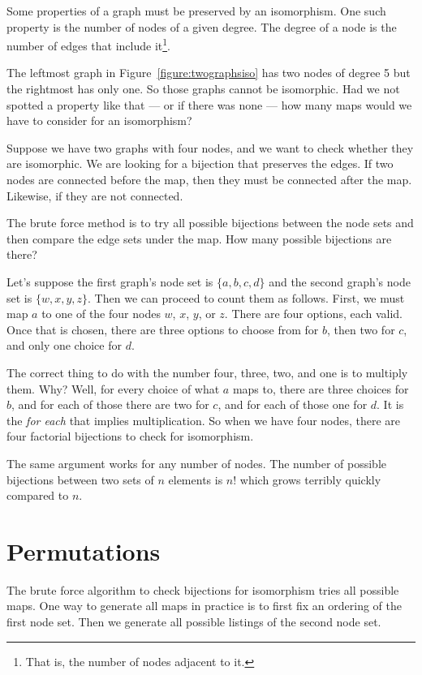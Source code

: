 \documentclass{iansnotes}
\begin{document}
  Some properties of a graph must be preserved by an isomorphism.
  One such property is the number of nodes of a given degree.
  The degree of a node is the number of edges that include it\footnote{That is, the number of nodes adjacent to it.}.

  The leftmost graph in Figure~\ref{figure:twographsiso} has two nodes of degree 5 but the rightmost has only one.
  So those graphs cannot be isomorphic.
  Had we not spotted a property like that --- or if there was none --- how many maps would we have to consider for an isomorphism?

  Suppose we have two graphs with four nodes, and we want to check whether they are isomorphic.
  We are looking for a bijection that preserves the edges.
  If two nodes are connected before the map, then they must be connected after the map.
  Likewise, if they are not connected.

  The brute force method is to try all possible bijections between the node sets and then compare the edge sets under the map.
  How many possible bijections are there?
  
  Let's suppose the first graph's node set is $\{a, b, c, d\}$ and the second graph's node set is $\{w, x, y, z\}$.
  Then we can proceed to count them as follows.
  First, we must map $a$ to one of the four nodes $w$, $x$, $y$, or $z$.
  There are four options, each valid.
  Once that is chosen, there are three options to choose from for $b$, then two for $c$, and only one choice for $d$.

  The correct thing to do with the number four, three, two, and one is to multiply them.
  Why?
  Well, for every choice of what $a$ maps to, there are three choices for $b$, and for each of those there are two for $c$, and for each of those one for $d$.
  It is the \emph{for each} that implies multiplication.
  So when we have four nodes, there are four factorial bijections to check for isomorphism.

  The same argument works for any number of nodes.
  The number of possible bijections between two sets of $n$ elements is $n!$ which grows terribly quickly compared to $n$.

\section{Permutations}
  The brute force algorithm to check bijections for isomorphism tries all possible maps.
  One way to generate all maps in practice is to first fix an ordering of the first node set.
  Then we generate all possible listings of the second node set.
  
\end{document}

